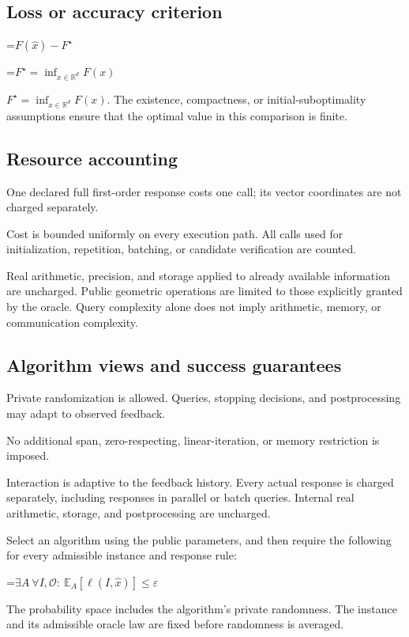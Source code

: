 \documentclass[10pt,a4paper]{article}
\newcommand{\AtlasMath}[1]{\par\begingroup\centering\setbox0=\hbox{$\displaystyle #1$}\ifdim\wd0>1.4\linewidth\typeout{ATLAS WIDE FORMULA: \the\wd0}\fi\ifdim\wd0>\linewidth\resizebox{\linewidth}{!}{\box0}\else\box0\fi\par\endgroup}
\newcommand{\AtlasInlineMath}[1]{\begingroup\setbox0=\hbox{$#1$}\ifdim\wd0>.4\linewidth\endgroup\AtlasMath{#1}\else\endgroup$#1$\fi}
\begin{document}
\subsection{Loss or accuracy criterion}

\AtlasMath{F(\widehat{x})-F^\star}


\AtlasInlineMath{F^\star=\inf_{x\in \mathbb{R}^d}F(x)}. The existence, compactness, or initial-suboptimality assumptions ensure that the optimal value in this comparison is finite.

\subsection{Resource accounting}
One declared full first-order response costs one call; its vector coordinates are not charged separately.

Cost is bounded uniformly on every execution path. All calls used for initialization, repetition, batching, or candidate verification are counted.

Real arithmetic, precision, and storage applied to already available information are uncharged. Public geometric operations are limited to those explicitly granted by the oracle. Query complexity alone does not imply arithmetic, memory, or communication complexity.

\subsection{Algorithm views and success guarantees}
Private randomization is allowed. Queries, stopping decisions, and postprocessing may adapt to observed feedback.

No additional span, zero-respecting, linear-iteration, or memory restriction is imposed.

Interaction is adaptive to the feedback history. Every actual response is charged separately, including responses in parallel or batch queries. Internal real arithmetic, storage, and postprocessing are uncharged.

Select an algorithm using the public parameters, and then require the following for every admissible instance and response rule:


\AtlasMath{\exists A\ \forall I,\mathcal{O}:\ \mathbb{E}_A[\ell(I,\widehat{x})]\le\varepsilon}


The probability space includes the algorithm's private randomness. The instance and its admissible oracle law are fixed before randomness is averaged.
\end{document}
